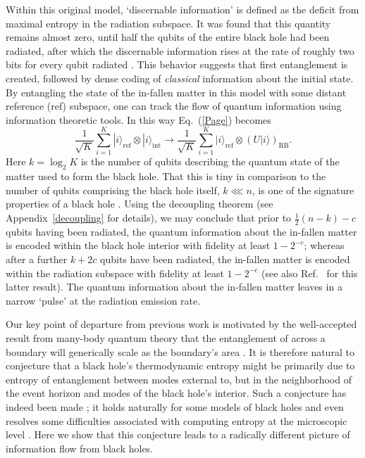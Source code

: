 \documentclass[twocolumn,aps,prl,amsmath,amssymb,floatfix]{revtex4}
\begin{document}
Within this original model, `discernable information' is defined as
the deficit from maximal entropy in the radiation subspace. It was
found that this quantity remains almost zero, until half the qubits
of the entire black hole had been radiated, after which the discernable
information rises at the rate of roughly two bits for every qubit
radiated \cite{Page93}. This behavior suggests that first entanglement
is created, followed by dense coding \cite{Bennett92} of {\it classical\/}
information about the initial state. By entangling the state of the
in-fallen matter in this model with some distant reference (ref) subspace,
one can track the flow of quantum information using information
theoretic tools. In this way Eq.~(\ref{Page}) becomes \cite{Hayden07}
\begin{equation}
\frac{1}{\sqrt{K}}\sum_{i=1}^{K}
|i\rangle_{\text{ref}}\otimes|i\rangle_{\text{int}}\rightarrow
\frac{1}{\sqrt{K}}\sum_{i=1}^{K}
|i\rangle_{\text{ref}}\otimes(U|i\rangle)_{\text{RB}}.
\label{HaydenPreskill}
\end{equation}
Here $k=\log_2 K$ is the number of qubits describing the quantum state
of the matter used to form the black hole. That this is tiny in
comparison to the number of qubits comprising the black hole itself,
$k\lll n$, is one of the signature properties of a black
hole \cite{tHooft93}. Using the decoupling theorem \cite{Abey06} (see
Appendix~\ref{decoupling} for details), we may conclude that prior to
$\frac{1}{2}(n-k)-c$ qubits having been radiated, the quantum information
about the in-fallen matter is encoded within the black hole interior
with fidelity at least $1-2^{-c}$; whereas after a further $k + 2c$
qubits have been radiated, the in-fallen matter is encoded within
the radiation subspace with fidelity at least $1-2^{-c}$ (see also
Ref.~ for this latter result). The quantum
information about the in-fallen matter leaves in a narrow `pulse'
at the radiation emission rate.

Our key point of departure from previous work is motivated by the
well-accepted result from many-body quantum theory that the
entanglement of across a boundary will generically scale as the
boundary's area \cite{Eisert09}. It is therefore natural to conjecture
that a black hole's thermodynamic entropy might be primarily due to
entropy of entanglement between modes external to, but in the
neighborhood of the event horizon and modes of the black hole's
interior. Such a conjecture has indeed been made
\cite{tHooft85,Bombelli86,Srednicki93,Hawking01,Brustein06,Emparan06};
it holds naturally for some models of black holes \cite{Hawking01,Brustein06}
and even resolves some difficulties associated with computing entropy at
the microscopic level \cite{Emparan06}. Here we show that this conjecture
leads to a radically different picture of information flow from black
holes.
\end{document}

